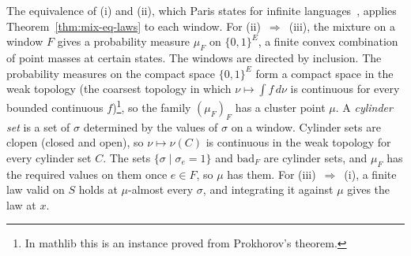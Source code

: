 \noindent
The equivalence of (i) and (ii), which Paris states for infinite
languages~\cite{paris2001}, applies Theorem~\ref{thm:mix-eq-laws} to
each window. For (ii)~$\Rightarrow$~(iii), the mixture on a window $F$
gives a probability measure $\mu_F$ on $\{0,1\}^E$, a finite convex
combination of point masses at certain states. The windows are directed
by inclusion. The probability measures on the compact space
$\{0,1\}^E$ form a compact space in the weak topology (the
coarsest topology in which $\nu \mapsto \int f \, d\nu$ is continuous
for every bounded continuous $f$)\footnote{In \textsf{mathlib} this is an instance proved from
Prokhorov's theorem.}, so the family $(\mu_F)_F$ has a cluster point
$\mu$. A \emph{cylinder set} is a set of $\sigma$ determined by the
values of $\sigma$ on a window. Cylinder sets are clopen (closed and
open), so
$\nu \mapsto \nu(C)$ is continuous in the weak topology for every
cylinder set $C$. The sets $\{\sigma \mid \sigma_e = 1\}$ and
$\mathrm{bad}_F$ are cylinder sets, and $\mu_F$ has the required values
on them once $e \in F$, so $\mu$ has them. For (iii)~$\Rightarrow$~(i),
a finite law valid on $S$ holds at $\mu$-almost every $\sigma$, and
integrating it against $\mu$ gives the law at $x$.

